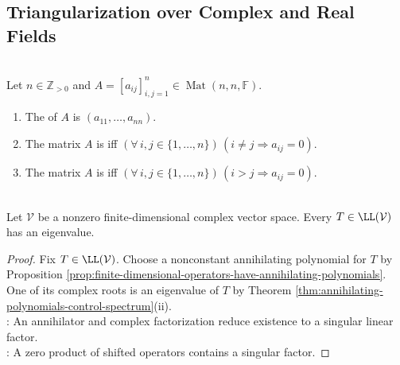 \subsection{Triangularization over Complex and Real Fields}

\begin{definition} \label{def:diagonal-and-upper-triangular-matrices} \\
Let $n\in\mathbb{Z}_{>0}$ and $A=[a_{ij}]_{i,j=1}^{n}\in\operatorname{Mat}(n,n,\mathbb{F})$.
\begin{enumerate}[label=(\roman*)]
\setlength{\itemsep}{0pt}
\item The  of $A$ is $(a_{11},\ldots,a_{nn})$.
\item The matrix $A$ is  iff $(\forall\,i,j\in\{1,\ldots,n\})\,(i\neq j\Rightarrow a_{ij}=0)$.
\item The matrix $A$ is  iff $(\forall\,i,j\in\{1,\ldots,n\})\,(i>j\Rightarrow a_{ij}=0)$.
\end{enumerate}
\end{definition}

\begin{theorem} \label{thm:complex-operator-has-eigenvalue} \\
Let $\mathcal{V}$ be a nonzero finite-dimensional complex vector space. Every $T\in\LL(\mathcal{V})$ has an eigenvalue.
\begin{proof}
Fix $T\in\LL(\mathcal{V})$. Choose a nonconstant annihilating polynomial for $T$ by Proposition \ref{prop:finite-dimensional-operators-have-annihilating-polynomials}.\\
One of its complex roots is an eigenvalue of $T$ by Theorem \ref{thm:annihilating-polynomials-control-spectrum}(ii).\\
: An annihilator and complex factorization reduce existence to a singular linear factor.\\
: A zero product of shifted operators contains a singular factor.
\end{proof}
\end{theorem}

